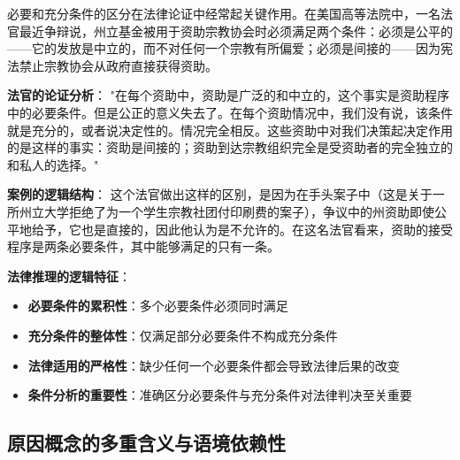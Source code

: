 \begin{examplebox}[title=法律论证中的必要条件与充分条件]
必要和充分条件的区分在法律论证中经常起关键作用。在美国高等法院中，一名法官最近争辩说，州立基金被用于资助宗教协会时必须满足两个条件：必须是公平的——它的发放是中立的，而不对任何一个宗教有所偏爱；必须是间接的——因为宪法禁止宗教协会从政府直接获得资助。

\textbf{法官的论证分析}：
"在每个资助中，资助是广泛的和中立的，这个事实是资助程序中的必要条件。但是公正的意义失去了。在每个资助情况中，我们没有说，该条件就是充分的，或者说决定性的。情况完全相反。这些资助中对我们决策起决定作用的是这样的事实：资助是间接的；资助到达宗教组织完全是受资助者的完全独立的和私人的选择。"

\textbf{案例的逻辑结构}：
这个法官做出这样的区别，是因为在手头案子中（这是关于一所州立大学拒绝了为一个学生宗教社团付印刷费的案子），争议中的州资助即使公平地给予，它也是直接的，因此他认为是不允许的。在这名法官看来，资助的接受程序是两条必要条件，其中能够满足的只有一条。

\textbf{法律推理的逻辑特征}：
\begin{itemize}
\item \textbf{必要条件的累积性}：多个必要条件必须同时满足
\item \textbf{充分条件的整体性}：仅满足部分必要条件不构成充分条件
\item \textbf{法律适用的严格性}：缺少任何一个必要条件都会导致法律后果的改变
\item \textbf{条件分析的重要性}：准确区分必要条件与充分条件对法律判决至关重要
\end{itemize}
\end{examplebox}

\subsection{原因概念的多重含义与语境依赖性}

